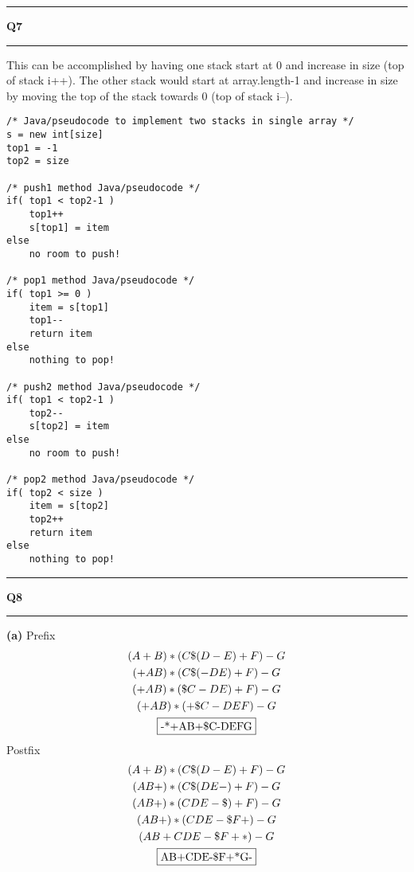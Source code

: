 \documentclass[11pt]{article}
\newcommand\question[2]{\vspace{.25in}\hrule\textbf{#1 #2}\vspace{.5em}\hrule\vspace{.10in}}
\renewcommand\part[1]{\vspace{.10in}\textbf{(#1)}}
\begin{document}
\newpage
\question{Q7}{}
This can be accomplished by having one stack start at 0 and increase in size (top of stack i++). The other stack would start at array.length-1 and increase in size by moving the top of the stack towards 0 (top of stack i--).
\begin{figure}[!h]
\centering
{}
\end{figure}
\begin{lstlisting}
/* Java/pseudocode to implement two stacks in single array */
s = new int[size]
top1 = -1
top2 = size

/* push1 method Java/pseudocode */
if( top1 < top2-1 ) 
	top1++
	s[top1] = item
else
	no room to push!

/* pop1 method Java/pseudocode */
if( top1 >= 0 )
	item = s[top1]
	top1--
	return item
else 
	nothing to pop!

/* push2 method Java/pseudocode */
if( top1 < top2-1 )
	top2--
	s[top2] = item
else 
	no room to push!

/* pop2 method Java/pseudocode */
if( top2 < size )
	item = s[top2]
	top2++
	return item
else
	nothing to pop!
\end{lstlisting}

\newpage
\question{Q8}{} 
\part{a}
Prefix
\begin{gather*}
(A+B)*(C\$(D-E)+F)-G \\
(+AB)*(C\$(-DE)+F)-G \\
(+AB)*(\$C-DE)+F)-G \\
(+AB)*(+\$C-DEF)-G \\
\fbox{-*+AB+\$C-DEFG}
\end{gather*}
Postfix
\begin{gather*}
(A+B)*(C\$(D-E)+F)-G \\
(AB+)*(C\$(DE-)+F)-G \\
(AB+)*(CDE-\$)+F)-G \\
(AB+)*(CDE-\$F+)-G \\
(AB+CDE-\$F+*)-G \\
\fbox{AB+CDE-\$F+*G-}
\end{gather*}
\end{document}
